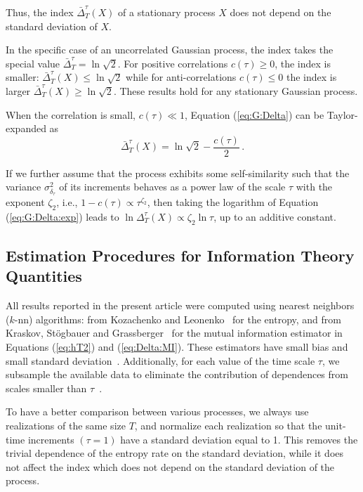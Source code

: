 \documentclass[aps,pra,groupedaddress,notitlepage]{revtex4-1}
\begin{document}
Thus, the index $\bar{\Delta}_T^{\tau}(X)$ of a stationary process $X$ does not depend on the standard deviation of $X$.

In the specific case of an uncorrelated Gaussian process, the index takes the special value $\bar{\Delta}_T^{\tau}=\ln\sqrt{2}$.
For positive correlations $c(\tau)\ge0$, the index is smaller: $\bar{\Delta}_T^{\tau}(X)\le \ln\sqrt{2}$ while for anti-correlations $c(\tau)\le0$ the index is larger $\bar{\Delta}_T^{\tau}(X)\ge \ln\sqrt{2}$. These results hold for any stationary Gaussian process. 

When the correlation is small, $c(\tau)\ll 1$, Equation (\ref{eq:G:Delta}) can be Taylor-expanded as
\begin{equation}
\bar{\Delta}_T^{\tau}(X)= \ln\sqrt{2} - \frac{c(\tau)}{2} \,. 
\label{eq:G:Delta:exp}
\end{equation}

If we further assume that the process exhibits some self-similarity such that the variance $\sigma_{\delta_\tau}^2$ of its increments  behaves as a power law of the scale $\tau$ with the exponent $\zeta_2$, {i.e.}, $1-c(\tau) \propto \tau^{\zeta_2}$, then taking the logarithm of Equation (\ref{eq:G:Delta:exp}) leads to $\ln {\Delta}_T^{\tau}(X) \propto \zeta_2 \ln \tau$, up to an additive constant.

\subsection{Estimation Procedures for Information Theory Quantities}

All results reported in the present article were computed using nearest neighbors ($k$-nn) algorithms: from Kozachenko and Leonenko~\cite{Kozachenko1987} for the entropy, and from Kraskov, St\"ogbauer and Grassberger~\cite{Grassberger2004} for the mutual information estimator in Equations (\ref{eq:hT2}) and  (\ref{eq:Delta:MI}). These estimators have small bias and small standard deviation~\cite{Grassberger2004, Gao2016, GraneroBelinchon2019, GraneroBelinchon2019a}. Additionally, for each value of the time scale $\tau$, we subsample the available data to eliminate the contribution of dependences from scales smaller than $\tau$~\cite{Theiler1986}.

To have a better comparison between various processes, we always use realizations of the same size $T$, and normalize each realization so that the unit-time increments $(\tau=1)$ have a standard deviation equal to 1. This removes the trivial dependence of the entropy rate on the standard deviation, while it does not affect the index which does not depend on the standard deviation of the process.
\end{document}
